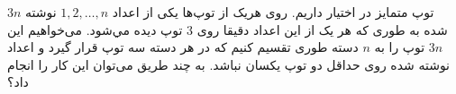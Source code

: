     \p
    $3n$
     توپ متمایز در اختیار داریم. روی هریک از توپ‌ها یکی از اعداد 
    $1, 2, \dots, n$ نوشته شده به طوری که هر یک از این اعداد دقیقا روی $3$ توپ ديده مي‌شود. می‌خواهیم این 
    $3n$ توپ را به $n$ دسته طوری تقسیم کنیم که در هر دسته سه توپ قرار گیرد و اعداد نوشته شده روی حداقل دو توپ یکسان نباشد. به چند طریق می‌توان این کار را انجام داد؟